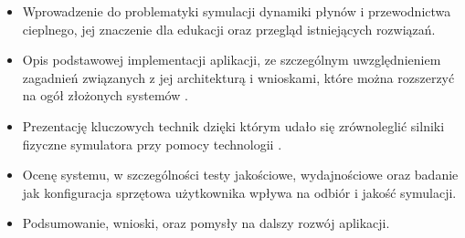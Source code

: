 \begin{itemize}

\item Wprowadzenie do problematyki symulacji dynamiki płynów i przewodnictwa
cieplnego, jej znaczenie dla edukacji oraz przegląd istniejących rozwiązań.

\item Opis podstawowej implementacji aplikacji, ze szczególnym uwzględnieniem
zagadnień związanych z jej architekturą i wnioskami, które można rozszerzyć na
ogół złożonych systemów .

\item Prezentację kluczowych technik dzięki którym udało się zrównoleglić
silniki fizyczne symulatora przy pomocy technologii .

\item Ocenę systemu, w szczególności testy jakościowe, wydajnościowe oraz
badanie jak konfiguracja sprzętowa użytkownika wpływa na odbiór i jakość
symulacji.

\item Podsumowanie, wnioski, oraz pomysły na dalszy rozwój aplikacji.

\end{itemize}

